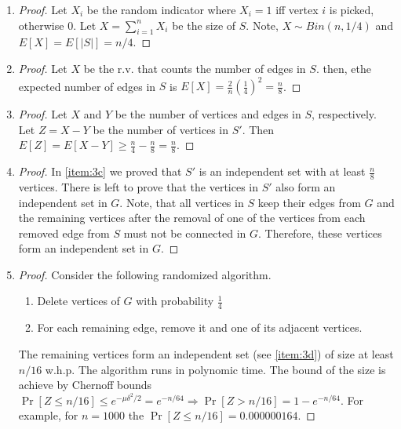 \documentclass[12pt, a4paper]{article} %
\newcommand{\pr}[1]{\Pr[#1]}
\begin{document}
\begin{enumerate}[label=(\alph*)]
  \item\label{item:3a} \begin{proof} Let $X_i$ be the random indicator where $X_i = 1$ iff vertex $i$ is picked, otherwise $0$. Let $X = \sum_{i = 1}^n X_i$ be the size of $S$. Note, $X \sim Bin(n, 1/4)$ and $E[X] = E[|S|] = n/4$.
  \end{proof}

\item\label{item:3b} \begin{proof} Let $X$ be the r.v. that counts the number of edges in $S$. then, ethe expected number of edges in $S$ is $E[X] = \frac{2}{n}(\frac{1}{4})^2 = \frac{n}{8}$.

  \end{proof}

\item\label{item:3c} \begin{proof} Let $X$ and $Y$ be the number of vertices and edges in $S$, respectively. Let $Z = X - Y$ be the number of vertices in $S'$. Then $E[Z] = E[X - Y] \geq \frac{n}{4} - \frac{n}{8} = \frac{n}{8}$.

  \end{proof}

\item\label{item:3d} \begin{proof} In \ref{item:3c} we proved that $S'$ is an independent set with at least $\frac{n}{8}$ vertices. There is left to prove that the vertices in $S'$ also form an independent set in $G$. Note, that all vertices in $S$ keep their edges from $G$ and the remaining vertices after the removal of one of the vertices from each removed edge from $S$ must not be connected in $G$. Therefore, these vertices form an independent set in $G$.

  \end{proof}

  \item\label{item:3e} \begin{proof} Consider the following randomized algorithm.

      \begin{enumerate}[label=\arabic*.]
        \item Delete vertices of $G$ with probability $\frac{1}{4}$
        \item For each remaining edge, remove it and one of its adjacent vertices.
      \end{enumerate}

    The remaining vertices form an independent set (see \ref{item:3d}) of size at least $n/16$ w.h.p. The algorithm runs in polynomic time. The bound of the size is achieve by Chernoff bounds $\pr{Z \leq n/16} \leq e^{-\mu\delta^2 / 2} = e^{-n/64} \Rightarrow \pr{Z > n/16} = 1 - e^{-n/64}$. For example, for $n = 1000$ the $\pr{Z \leq n/16} = 0.000000164$.

  \end{proof}
\end{enumerate}
\end{document}
